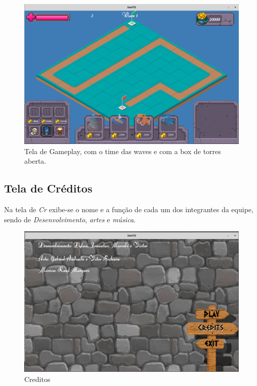 \documentclass[11pt]{article} %
\begin{document}
\begin{figure}[!htp]
\centering
\includegraphics[scale=0.3]{res/gameplay2.png}
\caption{Tela de Gameplay, com o time das waves e com a box de torres aberta.}
\end{figure}

\newpage
\subsection{Tela de Créditos}

Na tela de \textit{Cr} exibe-se o nome e a função de cada um dos integrantes da equipe, sendo de \textit{Desenvolvimento}, \textit{artes} e \textit{música}.

\begin{figure}[!htp]
\centering
\includegraphics[scale=0.3]{res/credits_display.png}
\caption{Creditos}
\end{figure}
\end{document}
